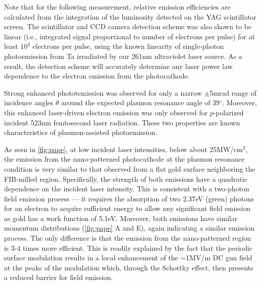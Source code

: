 Note that for the following measurement, relative emission efficiencies are calculated from the integration of the luminosity detected on the YAG scintillator screen.
The scintillator and CCD camera detection scheme was also shown to be linear (i.e., integrated signal proportional to number of electrons per pulse) for at least $10^4$ electrons per pulse, using the known linearity of single-photon photoemission from Ta irradiated by our 261nm ultraviolet laser source.
As a result, the detection scheme will accurately determine any laser power law dependence to the electron emission from the photocathode.

Strong enhanced phototemission was observed for only a narrow $\pm$5mrad range of incidence angles $\theta$ around the expected plasmon resonance angle of 39$^{\circ}$.
Moreover, this enhanced laser-driven electron emission was only observed for $p$-polarized incident 523nm femtosecond laser radiation.
These two properties are known characteristics of plasmon-assisted photoemission.

As seen in \ref{fig:pape}, at low incident laser intensities, below about 25MW/cm$^2$, the emission from the nano-patterned photocathode at the plasmon resonance condition is very similar to that observed from a flat gold surface neighboring the FIB-milled region.
Specifically, the strength of both emissions have a quadratic dependence on the incident laser intensity.
This is consistent with a two-photon field emission process --- it requires the absorption of two 2.37eV (green) photons for an electron to acquire sufficient energy to allow any significant field emission as gold has a work function of 5.1eV.
Moreover, both emissions have similar momentum distributions (\ref{fig:pape} A and E), again indicating a similar emission process.
The only difference is that the emission from the nano-patterned region is 3-4 times more efficient.
This is readily explained by the fact that the periodic surface modulation results in a local enhancement of the $\sim$1MV/m DC gun field at the peaks of the modulation which, through the Schottky effect, then presents a reduced barrier for field emission.

